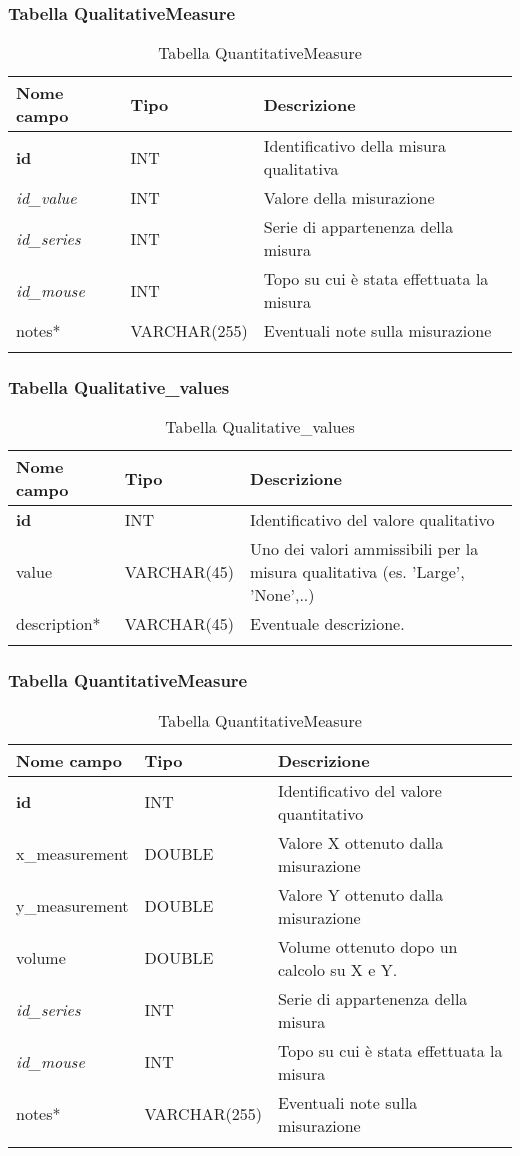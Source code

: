 \subsubsection{Tabella QualitativeMeasure}

\begin{longtable}{|l|l|p{6.0cm}|}
\hline
\textbf{Nome campo} &	\textbf{Tipo} &	\textbf{Descrizione}\\ \hline
\textbf{id} &	INT & Identificativo della misura qualitativa\\ \hline
\textit{id\_value} & INT &	Valore della misurazione\\ \hline
\textit{id\_series} & INT &	Serie di appartenenza della misura\\ \hline
\textit{id\_mouse} & INT &	Topo su cui \`e stata effettuata la misura\\ \hline
notes* &	VARCHAR(255) & Eventuali note sulla misurazione\\ \hline
\caption{Tabella QuantitativeMeasure}
\end{longtable}

\subsubsection{Tabella Qualitative\_values}

\begin{longtable}{|l|l|p{6.5cm}|}
\hline
\textbf{Nome campo} &	\textbf{Tipo} &	\textbf{Descrizione}\\ \hline
\textbf{id} &	INT &	Identificativo del valore qualitativo\\ \hline
value &	VARCHAR(45) &	Uno dei valori ammissibili per la misura qualitativa (es. 'Large', 'None',..)\\ \hline
description* &	VARCHAR(45) &	Eventuale descrizione.\\ \hline
\caption{Tabella Qualitative\_values}
\end{longtable}

\subsubsection{Tabella QuantitativeMeasure}

\begin{longtable}{|l|l|p{5.5cm}|}
\hline
\textbf{Nome campo} &	\textbf{Tipo} &	\textbf{Descrizione}\\ \hline
\textbf{id} &	INT &	Identificativo del valore quantitativo\\ \hline
x\_measurement &	DOUBLE &	Valore X ottenuto dalla misurazione\\ \hline
y\_measurement &	DOUBLE &	Valore Y ottenuto dalla misurazione\\ \hline
volume &	DOUBLE &	Volume ottenuto dopo un calcolo su X e Y.\\ \hline
\textit{id\_series} & INT &	Serie di appartenenza della misura\\ \hline
\textit{id\_mouse} & INT &	Topo su cui \`e stata effettuata la misura\\ \hline
notes* &	VARCHAR(255) & Eventuali note sulla misurazione\\ \hline
\caption{Tabella QuantitativeMeasure}
\end{longtable}

